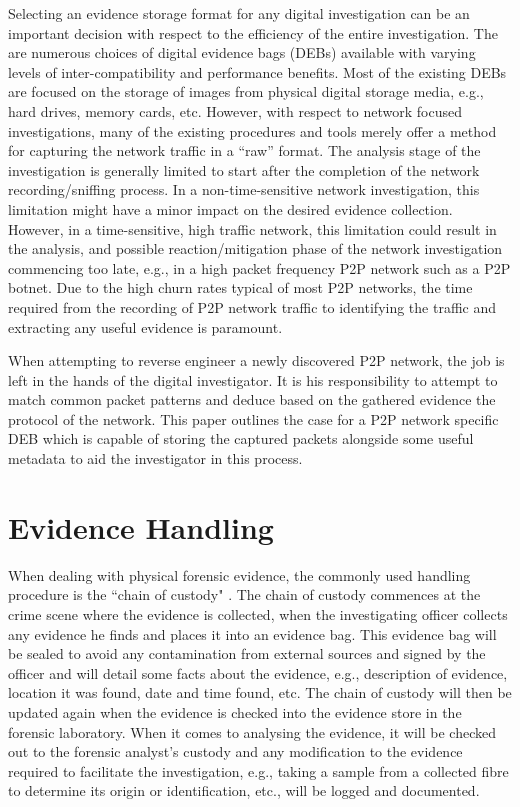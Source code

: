\documentclass[runningheads,a4paper]{llncs}
\begin{document}
Selecting an evidence storage format for any digital investigation can be an important decision with respect to the efficiency of the entire investigation. The are numerous choices of digital evidence bags (DEBs) available with varying levels of inter-compatibility and performance benefits. Most of the existing DEBs are focused on the storage of images from physical digital storage media, e.g., hard drives, memory cards, etc. However, with respect to network focused investigations, many of the existing procedures and tools merely offer a method for capturing the network traffic in a ``raw'' format. The analysis stage of the investigation is generally limited to start after the completion of the network recording/sniffing process. In a non-time-sensitive network investigation, this limitation might have a minor impact on the desired evidence collection. However, in a time-sensitive, high traffic network, this limitation could result in the analysis, and possible reaction/mitigation phase of the network investigation commencing too late, e.g., in a high packet frequency P2P network such as a P2P botnet. Due to the high churn rates typical of most P2P networks, the time required from the recording of P2P network traffic to identifying the traffic and extracting any useful evidence is paramount. 

When attempting to reverse engineer a newly discovered P2P network, the job is left in the hands of the digital investigator. It is his responsibility to attempt to match common packet patterns and deduce based on the gathered evidence the protocol of the network. This paper outlines the case for a P2P network specific DEB which is capable of storing the captured packets alongside some useful metadata to aid the investigator in this process.

\section{Evidence Handling}
\label{handling}

When dealing with physical forensic evidence, the commonly used handling procedure is the ``chain of custody" \cite{debq}. The chain of custody commences at the crime scene where the evidence is collected, when the investigating officer collects any evidence he finds and places it into an evidence bag. This evidence bag will be sealed to avoid any contamination from external sources and signed by the officer and will detail some facts about the evidence, e.g., description of evidence, location it was found, date and time found, etc. The chain of custody will then be updated again when the evidence is checked into the evidence store in the forensic laboratory. When it comes to analysing the evidence, it will be checked out to the forensic analyst's custody and any modification to the evidence required to facilitate the investigation, e.g., taking a sample from a collected fibre to determine its origin or identification, etc., will be logged and documented. 
\end{document}
